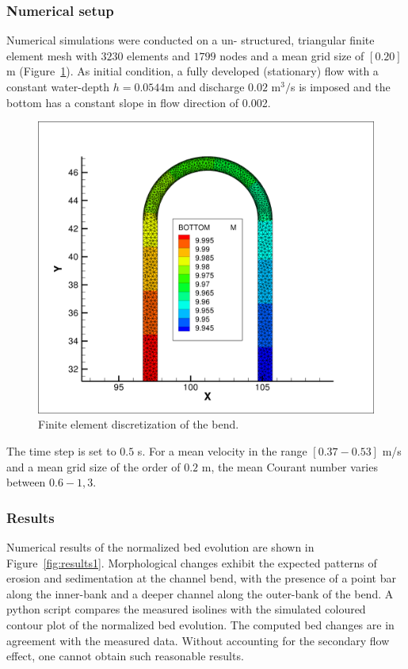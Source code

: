 \subsubsection{Numerical setup}
%
Numerical simulations were conducted on a un-
structured, triangular finite element mesh with
$3230$ elements and $1799$ nodes and a mean grid size of $[0.20]$ m (Figure~\ref{fig:mesh}). 
As initial condition, a fully developed (stationary) flow with a constant water-depth $h = 0.0544$m and discharge $0.02$ 
m$^3/$s is imposed and the bottom has a constant slope in flow direction of 0.002. 

\begin{figure} [!h]
\centering
\includegraphics[width=.96\textwidth]{../img/yen_grid_bottom.png}
 \caption{Finite element discretization of the bend.}\label{fig:mesh}
\end{figure}

The time step is set to $0.5$ s. For a mean velocity in the range $[0.37-0.53]$ m/s and 
a mean grid size of the order of $0.2$ m, the mean Courant number varies between $0.6-1,3$. 

\subsubsection{Results}
%
Numerical results of the normalized bed evolution are shown in Figure~\ref{fig:results1}. Morphological changes exhibit the expected
patterns of erosion and sedimentation at the channel bend, with the presence of a point bar along the inner-bank and a deeper 
channel along the outer-bank of the bend. A python script compares the measured isolines with the simulated coloured contour plot 
of the normalized bed evolution. 
The computed bed changes are in agreement with the measured data. Without accounting for the secondary flow effect, one cannot 
obtain such reasonable results. 

